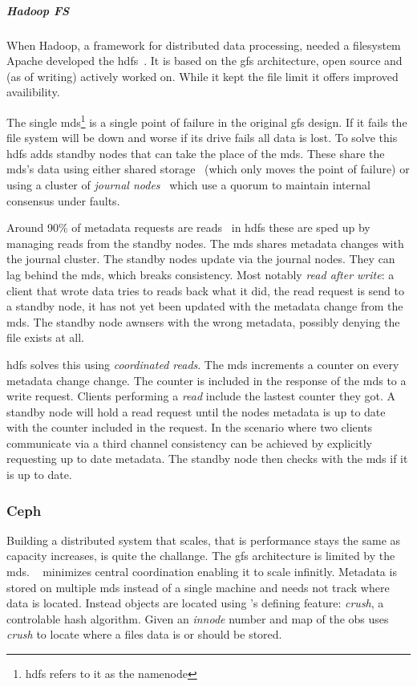 \subparagraph*{Hadoop FS} \label{sec:hdfs}
When Hadoop, a framework for distributed data processing, needed a filesystem Apache developed the \ac{hdfs}~\cite{hdfs}. It is based on the \ac{gfs} architecture, open source and (as of writing) actively worked on. While it kept the file limit it offers improved availibility.

The single \ac{mds}\footnote{\ac{hdfs} refers to it as the namenode} is a single point of failure in the original \ac{gfs} design. If it fails the file system will be down and worse if its drive fails all data is lost. To solve this \ac{hdfs} adds standby nodes that can take the place of the \ac{mds}. These share the \ac{mds}'s data using either shared storage~\cite{hdfs_ha_nfs} (which only moves the point of failure) or using a cluster of \textit{journal nodes}~\cite{hdfs_ha_q} which use a quorum to maintain internal consensus under faults. 

Around 90\% of metadata requests are reads~\cite{hdfs_ha_reads} in \ac{hdfs} these are sped up by managing reads from the standby nodes. The \ac{mds} shares metadata changes with the journal cluster. The standby nodes update via the journal nodes. They can lag behind the \ac{mds}, which breaks consistency. Most notably \textit{read after write}: a client that wrote data tries to reads back what it did, the read request is send to a standby node, it has not yet been updated with the metadata change from the \ac{mds}. The standby node awnsers with the wrong metadata, possibly denying the file exists at all. 

\ac{hdfs} solves this using \textit{coordinated reads}. The \ac{mds} increments a counter on every metadata change change. The counter is included in the response of the \ac{mds} to a write request. Clients performing a \textit{read} include the lastest counter they got. A standby node will hold a read request until the nodes metadata is up to date with the counter included in the request. In the scenario where two clients communicate via a third channel consistency can be achieved by explicitly requesting up to date metadata. The standby node then checks with the \ac{mds} if it is up to date.

\subsubsection*{Ceph} \label{sec:ceph}
Building a distributed system that scales, that is performance stays the same as capacity increases, is quite the challange. The \ac{gfs} architecture is limited by the \acf{mds}. \ceph{}~\cite{ceph} minimizes central coordination enabling it to scale infinitly. Metadata is stored on multiple \ac{mds} instead of a single machine and needs not track where data is located. Instead objects are located using \ceph{}'s defining feature: \emph{\ac{crush}}, a controlable hash algorithm. Given an \textit{innode} number and map of the \ac{obs} \ceph{} uses \emph{\ac{crush}} to locate where a files data is or should be stored. 

